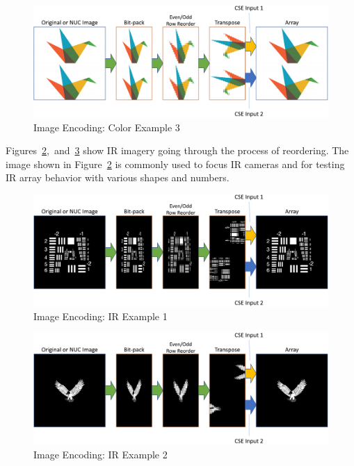     \begin{figure}
        \centering
        \includegraphics[width=1.0\textwidth]{fig/image_encoding_origami.pdf}
        \caption{Image Encoding: Color Example 3}
        \label{fig:image_encoding_color_example3}
    \end{figure}

    Figures~\ref{fig:image_encoding_ir_example1},~and~\ref{fig:image_encoding_ir_example2} show IR imagery going through the process of reordering. The image shown in Figure~\ref{fig:image_encoding_ir_example1} is commonly used to focus IR cameras and for testing IR array behavior with various shapes and numbers.

    \begin{figure}
        \centering
        \includegraphics[width=1.0\textwidth]{fig/image_encoding_ir1.pdf}
        \caption{Image Encoding: IR Example 1}
        \label{fig:image_encoding_ir_example1}
    \end{figure}

    \begin{figure}
        \centering
        \includegraphics[width=1.0\textwidth]{fig/image_encoding_ir2.pdf}
        \caption{Image Encoding: IR Example 2}
        \label{fig:image_encoding_ir_example2}
    \end{figure}

